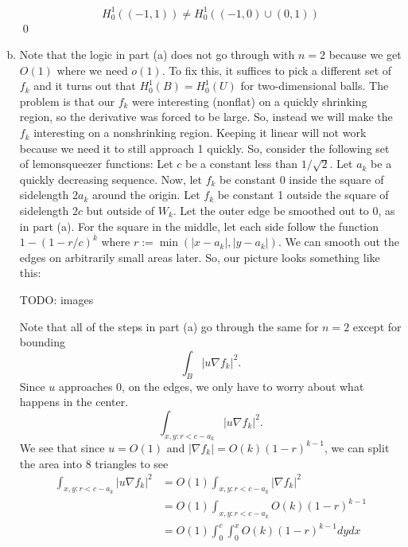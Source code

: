 \documentclass{article}
\newcommand{\D}{\nabla}
\begin{document}
\begin{enumerate}[(a)]
    \[ H_0^1((-1,1)) \ne H_0^1((-1,0) \cup (0,1))\]
    \qed
    \item Note that the logic in part (a) does not go through with $n=2$ because we get $O(1)$ where we need $o(1)$. To fix this, it suffices to pick a different set of $f_k$ and it turns out that $H_0^1(B) = H_0^1(U)$ for two-dimensional balls. The problem is that our $f_k$ were interesting (nonflat) on a quickly shrinking region, so the derivative was forced to be large. 
    \hop
    So, instead we will make the $f_k$ interesting on a nonshrinking region. Keeping it linear will not work because we need it to still approach 1 quickly. So, consider the following set of lemonsqueezer functions:
    \hop 
    Let $c$ be a constant less than $1/\sqrt{2}$. Let $a_k$ be a quickly decreasing sequence. Now, let $f_k$ be constant 0 inside the square of sidelength $2a_k$ around the origin. Let $f_k$ be constant 1 outside the square of sidelength $2c$ but outside of $W_k$. Let the outer edge be smoothed out to 0, as in part (a). For the square in the middle, let each side follow the function $1 - (1-r/c)^{k}$ where $r := \min(|x-a_k|, |y-a_k|)$. We can smooth out the edges on arbitrarily small areas later. So, our picture looks something like this: 

    TODO: images

    Note that all of the steps in part (a) go through the same for $n=2$ except for bounding 
    \[\int_B|u \D f_k|^2.\]
    Since $u$ approaches 0, on the edges, we only have to worry about what happens in the center. 
    \[\int_{x,y: r < c-a_k}|u \D f_k|^2.\]
    We see that since $u = O(1)$ and $|\D f_k| = O(k)(1-r)^{k-1}$, we can split the area into 8 triangles to see
    \begin{align*}
        \int_{x,y : r < c-a_k}|u \D f_k|^2 &= O(1) \int_{x,y : r < c-a_k}|\D f_k|^2 \\
        &=  O(1)\int_{x,y : r < c-a_k} O(k)(1-r)^{k-1} \\
        &= O(1)\int_0^c\int_0^x O(k)(1-r)^{k-1} dydx
    \end{align*}

\end{enumerate}
\end{document}
